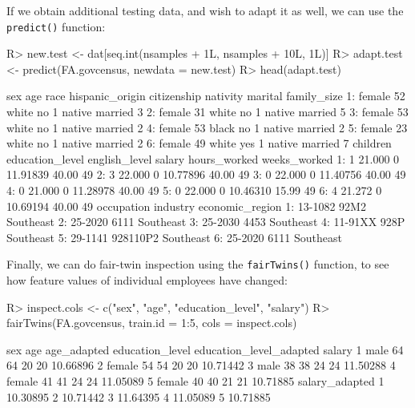 \documentclass[
  notitle]{jss}
\begin{document}
If we obtain additional testing data, and wish to adapt it as well, we
can use the \texttt{predict()} function:

\begin{CodeChunk}
\begin{CodeInput}
R> new.test <- dat[seq.int(nsamples + 1L, nsamples + 10L, 1L)]
R> adapt.test <- predict(FA.govcensus, newdata = new.test)
R> head(adapt.test)
\end{CodeInput}
\begin{CodeOutput}
      sex age  race hispanic_origin citizenship nativity marital family_size
1: female  52 white              no           1   native married           3
2: female  31 white              no           1   native married           5
3: female  53 white              no           1   native married           2
4: female  53 black              no           1   native married           2
5: female  23 white              no           1   native married           2
6: female  49 white             yes           1   native married           7
   children education_level english_level   salary hours_worked weeks_worked
1:        1          21.000             0 11.91839        40.00           49
2:        3          22.000             0 10.77896        40.00           49
3:        0          22.000             0 11.40756        40.00           49
4:        0          21.000             0 11.28978        40.00           49
5:        0          22.000             0 10.46310        15.99           49
6:        4          21.272             0 10.69194        40.00           49
   occupation industry economic_region
1:    13-1082     92M2       Southeast
2:    25-2020     6111       Southeast
3:    25-2030     4453       Southeast
4:    11-91XX     928P       Southeast
5:    29-1141 928110P2       Southeast
6:    25-2020     6111       Southeast
\end{CodeOutput}
\end{CodeChunk}

Finally, we can do fair-twin inspection using the \texttt{fairTwins()}
function, to see how feature values of individual employees have
changed:

\begin{CodeChunk}
\begin{CodeInput}
R> inspect.cols <- c("sex", "age", "education_level", "salary")
R> fairTwins(FA.govcensus, train.id = 1:5, cols = inspect.cols)
\end{CodeInput}
\begin{CodeOutput}
     sex age age_adapted education_level education_level_adapted   salary
1   male  64          64              20                      20 10.66896
2 female  54          54              20                      20 10.71442
3   male  38          38              24                      24 11.50288
4 female  41          41              24                      24 11.05089
5 female  40          40              21                      21 10.71885
  salary_adapted
1       10.30895
2       10.71442
3       11.64395
4       11.05089
5       10.71885
\end{CodeOutput}
\end{CodeChunk}
\end{document}
